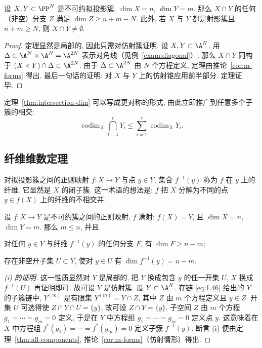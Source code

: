 \begin{theorem}\label{thm:intersection-dim}
	设 $X, Y \subset \PP^N$ 是不可约拟投影簇, $\dim X = n$, $\dim Y = m$. 那么 $X \cap Y$ 的任何（非空）分支 $Z$ 满足 $\dim Z \ge n + m - N$. 此外, 若 $X$ 与 $Y$ 都是射影簇且 $n + m \ge N$, 则 $X \cap Y \ne \emptyset$.
\end{theorem}

\begin{proof}
	定理显然是局部的, 因此只需对仿射簇证明. 设 $X, Y \subset \A^N$. 用 $\Delta \subset \A^N \times \A^N = \A^{2N}$ 表示对角线（见例~\ref{exam:diagonal}）. 那么 $X \cap Y$ 同构于 $(X \times Y) \cap \Delta \subset \A^{2N}$. 由于 $\Delta \subset \A^{2N}$ 由 $N$ 个方程定义, 定理由推论~\ref{cor:m-forms} 得出. 最后一句话的证明: 对 $X$ 与 $Y$ 上的仿射锥应用前半部分. 定理证毕.
\end{proof}

定理~\ref{thm:intersection-dim} 可以写成更对称的形式, 由此立即推广到任意多个子簇的相交:
\begin{equation}
	\label{eq:1.49}
	\operatorname{codim}_X \bigcap_{i=1}^{r} Y_i \le \sum_{i=1}^{r} \operatorname{codim}_X Y_i.
\end{equation}

\subsection{纤维维数定理}

对拟投影簇之间的正则映射 $f: X \to Y$ 与点 $y \in Y$, 集合 $f^{-1}(y)$ 称为 $f$ 在 $y$ 上的纤维. 它显然是 $X$ 的闭子簇. 这一术语的想法是: $f$ 把 $X$ 分解为不同的点 $y \in f(X)$ 上的纤维的不相交并.

\begin{theorem}\label{thm:fibre-dim}
	设 $f: X \to Y$ 是不可约簇之间的正则映射, $f$ 满射: $f(X) = Y$, 且 $\dim X = n$, $\dim Y = m$. 那么 $m \le n$, 并且
	\begin{compactenum}[(i)]
		\item 对任何 $y \in Y$ 与纤维 $f^{-1}(y)$ 的任何分支 $F$, 有 $\dim F \ge n - m$;
		\item 存在非空开子集 $U \subset Y$, 使对 $y \in U$ 有 $\dim f^{-1}(y) = n - m$.
	\end{compactenum}
\end{theorem}

\begin{proof}[(i) 的证明]
	这一性质显然对 $Y$ 是局部的, 把 $Y$ 换成包含 $y$ 的任一开集 $U$, $X$ 换成 $f^{-1}(U)$ 再证明即可. 故可设 $Y$ 是仿射簇. 设 $Y \subset \A^N$. 在链 \eqref{eq:1.46} 给出的 $Y$ 的子簇链中, $Y^{(m)}$ 是有限集 $Y^{(m)} = Y \cap Z$, 其中 $Z$ 由 $m$ 个方程定义且 $y \in Z$. 开集 $U$ 可选得使 $Z \cap Y \cap U = \{y\}$, 故可设 $Z \cap Y = \{y\}$. 子空间 $Z$ 由 $m$ 个方程 $g_1 = \cdots = g_m = 0$ 定义, 于是在 $Y$ 中方程组 $g_1 = \cdots = g_m = 0$ 定义点 $y$. 这意味着在 $X$ 中方程组 $f^*(g_1) = \cdots = f^*(g_m) = 0$ 定义子簇 $f^{-1}(y)$. 断言 (i) 便由定理~\ref{thm:all-components}, 推论~\ref{cor:m-forms}（仿射情形）得出.
\end{proof}


